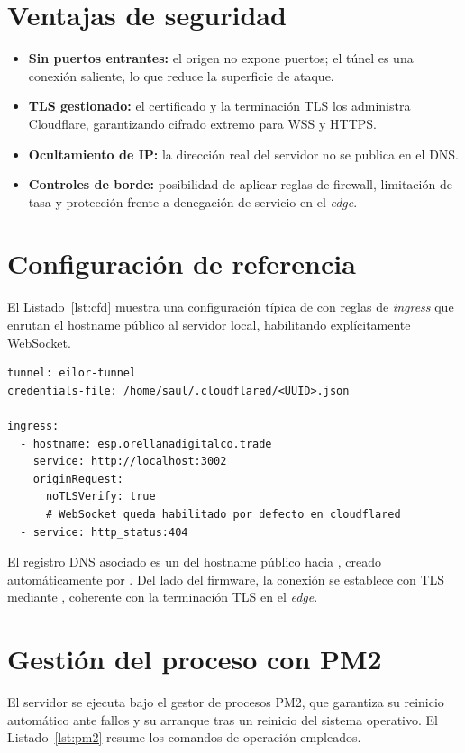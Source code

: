 \section{Ventajas de seguridad}
\begin{itemize}[leftmargin=1.4em]
  \item \textbf{Sin puertos entrantes:} el origen no expone puertos; el túnel es una conexión saliente, lo que reduce la superficie de ataque.
  \item \textbf{TLS gestionado:} el certificado y la terminación TLS los administra Cloudflare, garantizando cifrado extremo para WSS y HTTPS.
  \item \textbf{Ocultamiento de IP:} la dirección real del servidor no se publica en el DNS.
  \item \textbf{Controles de borde:} posibilidad de aplicar reglas de firewall, limitación de tasa y protección frente a denegación de servicio en el \emph{edge}.
\end{itemize}

\section{Configuración de referencia}
El Listado~\ref{lst:cfd} muestra una configuración típica de  con reglas de \emph{ingress} que enrutan el hostname público al servidor local, habilitando explícitamente WebSocket.

\begin{lstlisting}[caption={Configuración de Cloudflare Tunnel (config.yml)},label={lst:cfd},basicstyle=\ttfamily\footnotesize]
tunnel: eilor-tunnel
credentials-file: /home/saul/.cloudflared/<UUID>.json

ingress:
  - hostname: esp.orellanadigitalco.trade
    service: http://localhost:3002
    originRequest:
      noTLSVerify: true
      # WebSocket queda habilitado por defecto en cloudflared
  - service: http_status:404
\end{lstlisting}

El registro DNS asociado es un  del hostname público hacia , creado automáticamente por . Del lado del firmware, la conexión se establece con TLS mediante , coherente con la terminación TLS en el \emph{edge}.

\section{Gestión del proceso con PM2}
El servidor se ejecuta bajo el gestor de procesos PM2, que garantiza su reinicio automático ante fallos y su arranque tras un reinicio del sistema operativo. El Listado~\ref{lst:pm2} resume los comandos de operación empleados.

